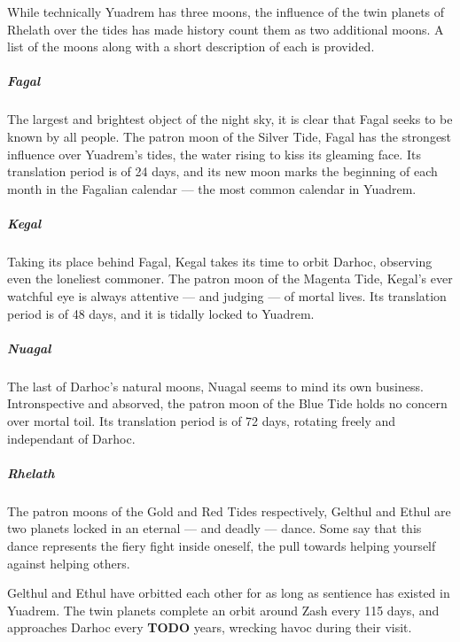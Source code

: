 While technically Yuadrem has three moons, the influence of the twin planets of Rhelath over the tides has made history count them as two additional moons.
A list of the moons along with a short description of each is provided.

\pagebreak

\subparagraph{Fagal} The largest and brightest object of the night sky, it is clear that Fagal seeks to be known by all people.
The patron moon of the Silver Tide, Fagal has the strongest influence over Yuadrem's tides, the water rising to kiss its gleaming face.
Its translation period is of 24 days, and its new moon marks the beginning of each month in the Fagalian calendar --- the most common calendar in Yuadrem.

\subparagraph{Kegal} Taking its place behind Fagal, Kegal takes its time to orbit Darhoc, observing even the loneliest commoner.
The patron moon of the Magenta Tide, Kegal's ever watchful eye is always attentive --- and judging --- of mortal lives.
Its translation period is of 48 days, and it is tidally locked to Yuadrem.

\subparagraph{Nuagal} The last of Darhoc's natural moons, Nuagal seems to mind its own business.
Intronspective and absorved, the patron moon of the Blue Tide holds no concern over mortal toil.
Its translation period is of 72 days, rotating freely and independant of Darhoc.

\subparagraph{Rhelath} The patron moons of the Gold and Red Tides respectively, Gelthul and Ethul are two planets locked in an eternal --- and deadly --- dance.
Some say that this dance represents the fiery fight inside oneself, the pull towards helping yourself against helping others.

Gelthul and Ethul have orbitted each other for as long as sentience has existed in Yuadrem.%
The twin planets complete an orbit around Zash every 115 days, and approaches Darhoc every \textbf{TODO} years, wrecking havoc during their visit.

\pagebreak
